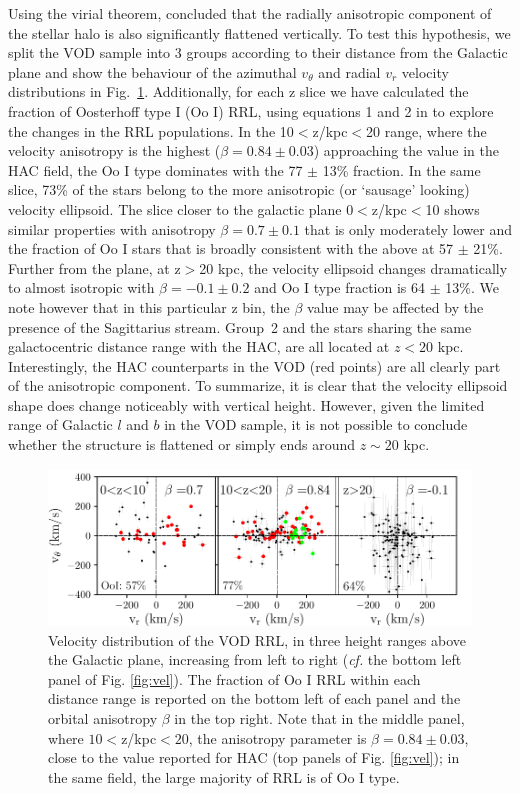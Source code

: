 \documentclass[a4paper,useAMS,usenatbib]{mnras}
\begin{document}
Using the virial theorem, \citet{actionhalo} concluded that the
radially anisotropic component of the stellar halo is also
significantly flattened vertically. To test this hypothesis, we split
the VOD sample into 3 groups according to their distance from the
Galactic plane and show the behaviour of the azimuthal $v_{\theta}$
and radial $v_{r}$ velocity distributions in
Fig.~\ref{fig:VOD_vel}. Additionally, for each z slice we have
calculated the fraction of Oosterhoff type I (Oo I) RRL, using
equations 1 and 2 in \citet{Be2018} to explore the changes in the RRL
populations. In the 10$<$z/kpc$<$20 range, where the velocity anisotropy
is the highest ($\beta = 0.84 \pm 0.03$) approaching the value in the
HAC field, the Oo I type dominates with the 77 $\pm$ 13\% fraction. In the same
slice, 73\% of the stars belong to the more anisotropic (or `sausage'
looking) velocity ellipsoid. The slice closer to the galactic plane 
0$<$z/kpc$<$10 shows similar properties with anisotropy $\beta
= 0.7 \pm 0.1$ that is only moderately lower and the fraction of Oo I stars
that is broadly consistent with the above at 57 $\pm$ 21\%. Further from
the plane, at z$>$20 kpc, the velocity ellipsoid changes dramatically
to almost isotropic with $\beta = -0.1 \pm 0.2$ and Oo I type fraction
is 64 $\pm$ 13\%. We note however that in this particular z bin, the
$\beta$ value may be affected by the presence of the Sagittarius
stream. Group~2 and the stars sharing the same galactocentric distance
range with the HAC, are all located at $z<20$ kpc. Interestingly, the
HAC counterparts in the VOD (red points) are all clearly part of the
anisotropic component. To summarize, it is clear that the velocity
ellipsoid shape does change noticeably with vertical height. However,
given the limited range of Galactic $l$ and $b$ in the VOD sample, it
is not possible to conclude whether the structure is flattened or
simply ends around $z\sim20$ kpc.
%   
%
\begin{figure}
	        \includegraphics[scale=0.55]{VOD_velocities_vphi_zcuts.pdf}
\vspace{-0.45cm}
   \caption{Velocity distribution of the VOD RRL, in three
     height ranges above the Galactic plane, increasing from left to
     right ({\it cf.} the bottom left panel of Fig.
     \ref{fig:vel}). The fraction of Oo I RRL within
     each distance range is reported on the bottom left of each panel
     and the orbital anisotropy $\beta$ in the top right. Note that in
     the middle panel, where $10<$z/kpc$<20$, the anisotropy
     parameter is $\beta=0.84\pm0.03$, close to the value reported for
     HAC (top panels of Fig.  \ref{fig:vel}); in the same field, the
     large majority of RRL is of Oo I type.}
    \label{fig:VOD_vel}
\end{figure}
%
\end{document}

